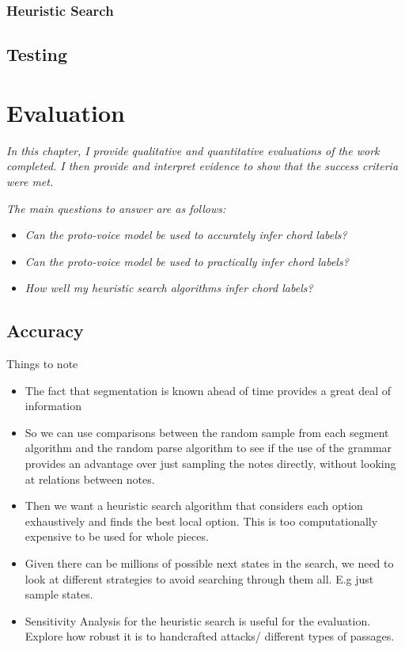 \documentclass[12pt,a4paper,twoside,openright]{report}
\begin{document}
\subsection{Heuristic Search}
\section{Testing}


\chapter{Evaluation}
\textit{In this chapter, I provide qualitative and quantitative evaluations of the work completed. I then provide and interpret evidence to show that the success criteria were met.}

\textit{The main questions to answer are as follows:}
\begin{itemize}
  \item \textit{Can the proto-voice model be used to accurately infer chord labels?}
  \item \textit{Can the proto-voice model be used to practically infer chord labels?}
  \item \textit{How well my heuristic search algorithms infer chord labels?}
\end{itemize}

\section{Accuracy}
Things to note
\begin{itemize}
  \item The fact that segmentation is known ahead of time provides a great deal of information \cite{gothamWhatIfWhen2021}
  \item So we can use comparisons between the random sample from each segment algorithm and the random parse algorithm to see if the use of the grammar provides an advantage over just sampling the notes directly, without looking at relations between notes.
  \item Then we want a heuristic search algorithm that considers each option exhaustively and finds the best local option. This is too computationally expensive to be used for whole pieces. 
  \item Given there can be millions of possible next states in the search, we need to look at different strategies to avoid searching through them all. E.g just sample states. 
  \item Sensitivity Analysis for the heuristic search is useful for the evaluation. Explore how robust it is to handcrafted attacks/ different types of passages.
\end{itemize}
\end{document}
